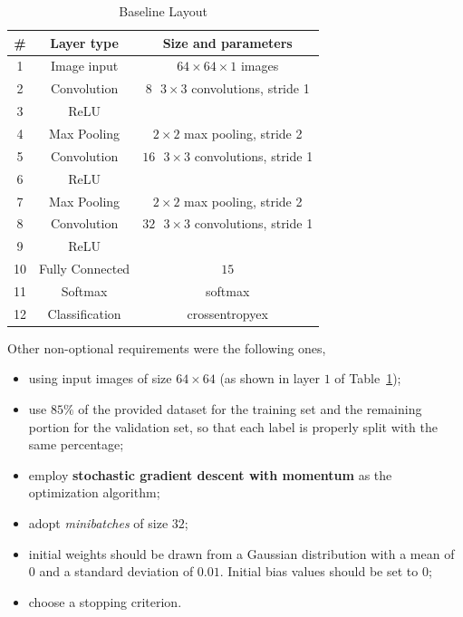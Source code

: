 \documentclass[a4paper, 11pt]{article} %
\begin{document}
\begin{table}[ht]
\centering
\begin{tabular}{|c|c|c|}
\hline 
\textbf{\#} & \textbf{Layer type} & \textbf{Size and parameters} \\
\hline \hline 
1 & Image input & $64 \times 64 \times 1$ images \\
\hline 
2 & Convolution & $8 \mbox{ } 3 \times 3$ convolutions, stride 1 \\
\hline 
3 & ReLU &  \\
\hline 
4 & Max Pooling & $2 \times 2$ max pooling, stride 2 \\
\hline
5 & Convolution & $16 \mbox{ } 3 \times 3$ convolutions, stride 1 \\
\hline 
6 & ReLU &  \\
\hline 
7 & Max Pooling & $2 \times 2$ max pooling, stride 2 \\
\hline
8 & Convolution & $32 \mbox{ } 3 \times 3$ convolutions, stride 1 \\
\hline 
9 & ReLU & \\
\hline 
10 & Fully Connected & $15$ \\
\hline
11 & Softmax & softmax \\ 
\hline 
12 & Classification & crossentropyex \\
\hline
\end{tabular}
\caption{Baseline Layout}\label{tab:baseline-layout}
\end{table}
\bigskip

Other non-optional requirements were the following ones,

\begin{itemize}
    \item using input images of size $64 \times 64$ (as shown in layer $1$ of Table~\ref{tab:baseline-layout});
    \item use $85\%$ of the provided dataset for the training set and the remaining portion for the validation set, so that each label is properly split with the same percentage;
    \item employ \textbf{stochastic gradient descent with momentum} as the optimization algorithm;
    \item adopt \emph{minibatches} of size $32$;
    \item initial weights should be drawn from a Gaussian distribution with a mean of $0$ and a standard deviation of $0.01$. Initial bias values should be set to $0$;
    \item choose a stopping criterion.
\end{itemize}
\end{document}
